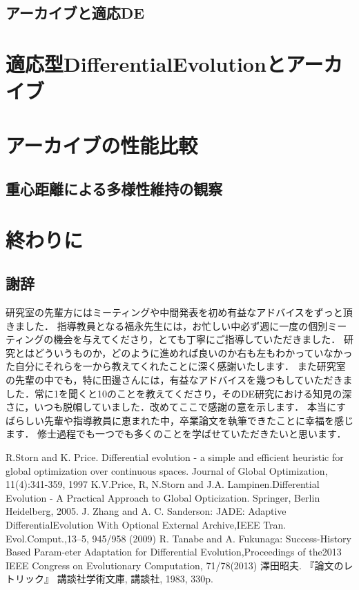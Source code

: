 \documentclass[a4paper,11pt,oneside,openany]{jsbook}
\begin{document}
\section{アーカイブと適応DE}
\chapter{適応型DifferentialEvolutionとアーカイブ}
\chapter{アーカイブの性能比較}
\section{重心距離による多様性維持の観察}
\section{}

\chapter{終わりに}
\section{謝辞}
研究室の先輩方にはミーティングや中間発表を初め有益なアドバイスをずっと頂きました．
指導教員となる福永先生には，お忙しい中必ず週に一度の個別ミーティングの機会を与えてくださり，とても丁寧にご指導していただきました．
研究とはどういうものか，どのように進めれば良いのか右も左もわかっていなかった自分にそれらを一から教えてくれたことに深く感謝いたします．
また研究室の先輩の中でも，特に田邊さんには，有益なアドバイスを幾つもしていただきました．常に1を聞くと10のことを教えてくださり，そのDE研究における知見の深さに，いつも脱帽していました．改めてここで感謝の意を示します．
本当にすばらしい先輩や指導教員に恵まれた中，卒業論文を執筆できたことに幸福を感じます．
修士過程でも一つでも多くのことを学ばせていただきたいと思います．

\begin{thebibliography}{10}
 R.Storn and K. Price. Differential evolution - a simple and efficient heuristic for global optimization over continuous spaces. Journal of Global Optimization, 11(4):341-359, 1997 
  K.V.Price, R, N.Storn and J.A. Lampinen.Differential Evolution - A Practical Approach to Global Opticization. Springer, Berlin Heidelberg, 2005.
  J. Zhang and A. C. Sanderson: JADE: Adaptive DifferentialEvolution With Optional External Archive,IEEE Tran. Evol.Comput.,13–5, 945/958 (2009)
  R. Tanabe and A. Fukunaga: Success-History Based Param-eter Adaptation for Differential Evolution,Proceedings of the2013 IEEE Congress on Evolutionary Computation, 71/78(2013)
  澤田昭夫. 『論文のレトリック』 
   講談社学術文庫, 講談社, 1983, 330p.

\end{thebibliography}
\end{document}
